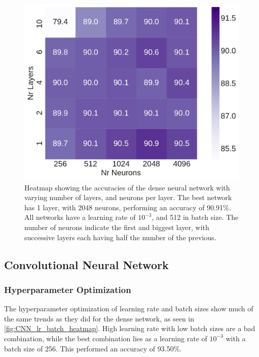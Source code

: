 \documentclass[10pt, twocolumn]{article}
\begin{document}
\begin{figure}[H]
    \centering
    \includegraphics[scale=0.4]{../figs/DNN_layers_neurons_heatmap.pdf}
    \caption{Heatmap showing the accuracies of the dense neural network with varying number of layers, and neurons per layer. The best network has 1 layer, with 2048 neurons, performing an accuracy of 90.91\%. All networks have a learning rate of $10^{-3}$, and 512 in batch size. The number of neurons indicate the first and biggest layer, with successive layers each having half the number of the previous.}
    \label{fig:DNN_hp2}
\end{figure}


\subsection{Convolutional Neural Network}
\subsubsection{Hyperparameter Optimization}
The hyperparameter optimization of learning rate and batch sizes show much of the same trends as they did for the dense network, as seen in \cref{fig:CNN_lr_batch_heatmap}. High learning rate with low batch sizes are a bad combination, while the best combination lies as a learning rate of $10^{-3}$ with a batch size of 256. This performed an accuracy of 93.50\%.
\end{document}
